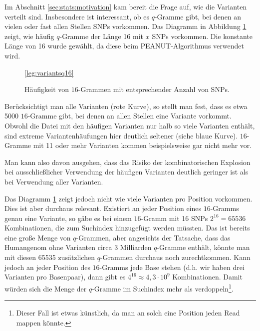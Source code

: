 Im Abschnitt \ref{sec:stats:motivation} kam bereit die Frage auf, wie die Varianten verteilt sind. Insbesondere ist interessant, ob es $q$-Gramme gibt, bei denen an vielen oder fast allen Stellen SNPs vorkommen. Das Diagramm in Abbildung \ref{fig:stats:variantsq16} zeigt, wie häufig $q$-Gramme der Länge 16 mit $x$ SNPs vorkommen. Die konstante Länge von 16 wurde gewählt, da diese beim PEANUT-Algorithmus verwendet wird.

\begin{figure}[htbp]
\pgfplotsset{footnotesize,width=12cm,compat=1.8}
\begin{center}
\ref*{leg:variantsq16}
\end{center}
\caption{Häufigkeit von $16$-Grammen mit entsprechender Anzahl von SNPs.}
\label{fig:stats:variantsq16}
\end{figure}

Berücksichtigt man alle Varianten (rote Kurve), so stellt man fest, dass es etwa 5000 $16$-Gramme gibt, bei denen an allen Stellen eine Variante vorkommt. Obwohl die Datei mit den häufigen Varianten nur halb so viele Varianten enthält, sind extreme Variantenhäufungen hier deutlich seltener (siehe blaue Kurve). $16$-Gramme mit 11 oder mehr Varianten kommen beispielsweise gar nicht mehr vor.

Man kann also davon ausgehen, dass das Risiko der kombinatorischen Explosion bei ausschließlicher Verwendung der häufigen Varianten deutlich geringer ist als bei Verwendung aller Varianten. 

Das Diagramm \ref{fig:stats:variantsq16} zeigt jedoch nicht wie viele Varianten pro Position vorkommen. Dies ist aber durchaus relevant. Existiert an jeder Position eines $16$-Gramms genau eine Variante, so gäbe es bei einem $16$-Gramm mit 16 SNPs $2^{16} = 65536$ Kombinationen, die zum Suchindex hinzugefügt werden müssten. Das ist bereits eine große Menge von $q$-Grammen, aber angesichts der Tatsache, dass das Humangenom ohne Varianten circa 3 Milliarden $q$-Gramme enthält, könnte man mit diesen 65535 zusätzlichen $q$-Grammen durchaus noch zurechtkommen. Kann jedoch an jeder Position des $16$-Gramms jede Base stehen (d.h. wir haben drei Varianten pro Basenpaar), dann gibt es $4^{16} \approx 4,3 \cdot 10^9$ Kombinationen. Damit würden sich die Menge der $q$-Gramme im Suchindex mehr als verdoppeln\footnote{Dieser Fall ist etwas künstlich, da man an solch eine Position jeden Read mappen könnte.}.

